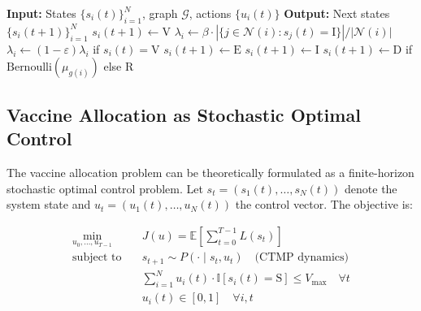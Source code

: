 \begin{algorithm}[t]
\caption{CTMP Simulation (one time step)}
\label{alg:ctmp}
\begin{algorithmic}[1]
\STATE \textbf{Input:} States $\{s_i(t)\}_{i=1}^N$, graph $\mathcal{G}$, actions $\{u_i(t)\}$
\STATE \textbf{Output:} Next states $\{s_i(t+1)\}_{i=1}^N$
        \STATE $s_i(t+1) \gets \text{V}$
        \STATE $\lambda_i \gets \beta \cdot |\{j \in \mathcal{N}(i) : s_j(t) = \text{I}\}| / |\mathcal{N}(i)|$
        \STATE $\lambda_i \gets (1-\varepsilon)\lambda_i$ if $s_i(t) = \text{V}$
            \STATE $s_i(t+1) \gets \text{E}$
        \ENDIF
        \STATE $s_i(t+1) \gets \text{I}$
        \STATE $s_i(t+1) \gets \text{D}$ if $\text{Bernoulli}(\mu_{g(i)})$ else $\text{R}$
    \ENDIF
\ENDFOR
\end{algorithmic}
\end{algorithm}

\subsection{Vaccine Allocation as Stochastic Optimal Control}
\label{sec:oc_formulation}

The vaccine allocation problem can be theoretically formulated as a finite-horizon
stochastic optimal control problem. Let $s_t = (s_1(t), \ldots, s_N(t))$ denote the
system state and $u_t = (u_1(t), \ldots, u_N(t))$ the control vector. The objective is:

\begin{equation}
\begin{aligned}
\min_{u_0, \ldots, u_{T-1}} \quad & J(u) = \mathbb{E}\left[ \sum_{t=0}^{T-1} L(s_t) \right] \\
\text{subject to} \quad & s_{t+1} \sim P(\cdot \mid s_t, u_t) \quad \text{(CTMP dynamics)} \\
& \sum_{i=1}^N u_i(t) \cdot \mathbb{I}[s_i(t) = \text{S}] \leq V_{\max} \quad \forall t \\
& u_i(t) \in [0, 1] \quad \forall i, t
\end{aligned}
\label{eq:oc_problem}
\end{equation}

